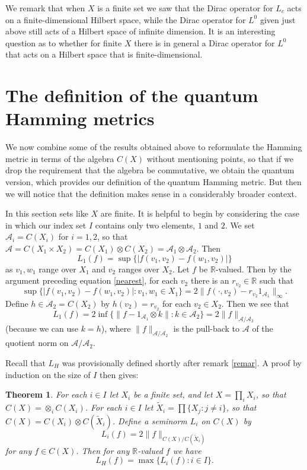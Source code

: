 \documentclass{amsart}[14pt]
\newtheorem{theorem}{Theorem}[section]
\theoremstyle{definition}
\theoremstyle{remark}
\newcommand{\cA}{{\mathcal A}}
\newcommand{\bR}{{\mathbb R}}
\newcommand{\<}{\langle}
\renewcommand{\>}{\rangle}
\numberwithin{equation}{section}
\begin{document}
{We remark that when $X$ is a finite set we saw that the
Dirac operator for $L_c$ acts on a finite-dimensional
Hilbert space, while the Dirac operator for $L^0$ 
given just above still
acts of a Hilbert space of infinite dimension. It is an
interesting question as to whether for finite $X$ 
there is in general
a Dirac operator for $L^0$ that acts on a Hilbert
space that is finite-dimensional.


\section{The definition of the quantum Hamming metrics}
\label{alg}

We now combine some of the results obtained above to
reformulate the Hamming metric in terms of the algebra
$C(X)$ without mentioning points, so that if we drop
the requirement that the algebra be commutative, we
obtain the quantum version, which provides our
definition of the quantum Hamming metric. But then
we will notice that the definition makes sense in a
considerably broader context. 

In this
section sets like $X$ are finite.
It is helpful to begin by considering the case in which
our index set $I$ contains only two elements, $1$ and $2$. 
We set $\cA_i = C(X_i)$ for $i = 1,2$, 
so that $\cA = C(X_1 \times X_2) = C(X_1)\otimes C(X_2) 
= \cA_1 \otimes \cA_2$.
Then
 \[
L_1(f) = \sup  \{|f(v_1, v_2)-f(w_1, v_2)|  \}
\]
as $v_1, w_1$ range over $X_1$ and $v_2$ ranges over $X_2$.
 Let $f$ be $\bR$-valued. Then by the argument preceding equation \ref{nearest}, 
 for each $v_2$ there is an $r_{v_2} \in \bR$ such that
 \[
 \sup \{ |f(v_1, v_2)-f(w_1, v_2)|  : v_1, w_1 \in X_1\}
 = 2 \| f(\cdot, v_2) - r_{v_2} 1_{\cA_1}\|_\infty .
 \]
 Define $h\in \cA_2=C(X_2)$ by $h(v_2) = r_{v_2}$ for each $v_2 \in X_2$. 
Then
we see that 
 \[
L_1(f) = 2 \inf \{\|f- 1_{\cA_1}\otimes k\|: k\in \cA_2\} = 2\|f\|_{\cA/\cA_2}
 \]
 (because we can use $k = h$),
where $ \|f\|_{\cA/\cA_2}$ is the pull-back to
$\cA$ of the quotient norm on $\cA/\cA_2$. 
   
Recall that $L_H$ was provisionally defined shortly
after remark \ref{remar}.
A proof by induction on the size of $I$ then gives:

\begin{theorem}
For each $i \in I$ let $X_i$ be a finite set, and let $X = \prod_i X_i $,
so that $C(X) = \otimes_i C(X_i)$.
For each $i \in I$ 
let $\tilde X_i = \prod\{X_j: j \neq i\}$, 
so that $C(X) =  C(X_i) \otimes C(\tilde X_i)$.  
Define a seminorm $L_i$ on $C(X)$ by 
\[
L_i(f) = 2\|f\|_{C(X)/C(\tilde X_i)}
\]
for any $f \in C(X)$.
Then for any $\bR$-valued $f$ we have
\[
L_H(f) = \max \{L_i(f): i \in I\}  .
\]
\end{theorem}

}
\end{document}
